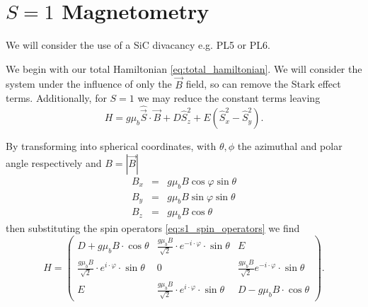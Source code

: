 \section{$S=1$ Magnetometry}\label{s1_magnetometry}
We will consider the use of a SiC divacancy e.g. PL5 or PL6.

We begin with our total Hamiltonian \eqref{eq:total_hamiltonian}. We will consider the system under the influence of only the $\vec{B}$ field, so can remove the Stark effect terms. Additionally, for $S=1$ we may reduce the constant terms \cite{Christle2014} leaving
\begin{equation}
	H = g\mu_b \hat{\vec{S}}\cdot\vec{B} + D\hat{S}_z^2 + E (\hat{S}_x^2 - \hat{S}_y^2).
	\label{eq:s1_magnetometry_hamiltonian}
\end{equation}

By transforming into spherical coordinates, with $\theta, \phi$ the azimuthal and polar angle respectively and $B = |\vec{B}|$
\begin{equation}
	\begin{align}
		B_x & = & g\mu_b B \cos\varphi \sin\theta \\
		B_y & = & g\mu_b B \sin\varphi \sin\theta \\
		B_z & = & g\mu_b B \cos\theta
	\end{align}
	\label{eq:polar_transform}
\end{equation}
then substituting the spin operators \eqref{eq:s1_spin_operators} we find
\begin{equation}
	H = \begin{pmatrix}
		D + g\mu_b B \cdot \cos \theta                                       & \frac{g\mu_b B}{\sqrt{2}} \cdot e^{-i\cdot \varphi} \cdot \sin\theta & E                                                              \\
		\frac{g\mu_b B}{\sqrt{2}} \cdot e^{i \cdot \varphi} \cdot \sin\theta & 0                                                                    & \frac{g\mu_b B}{\sqrt{2}} e^{-i\cdot \varphi} \cdot \sin\theta \\
		E                                                                    & \frac{g\mu_b B}{\sqrt{2}} \cdot e^{i \cdot \varphi} \cdot \sin\theta & D - g\mu_b B \cdot \cos \theta
	\end{pmatrix}.
	\label{eq:s1_magnetometry_hamil_spherical_matrix}
\end{equation}



